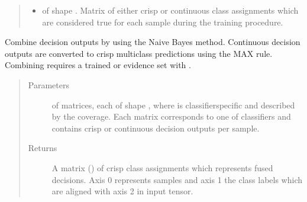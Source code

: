 \documentclass[letterpaper,10pt,english]{sphinxmanual}
\begin{document}
\begin{fulllineitems}
\begin{fulllineitems}
\begin{quote}
\begin{description}
\begin{itemize}
\item {} 
\sphinxAtStartPar
{} \textendash{}  of shape .
Matrix of either crisp or continuous class assignments which are considered true for each sample during
the training procedure.

\end{itemize}

\end{description}\end{quote}

\end{fulllineitems}


\begin{fulllineitems}
\label{\detokenize{pusion.core.naive_bayes_combiner:pusion.core.naive_bayes_combiner.CRNaiveBayesCombiner.combine}}
\sphinxAtStartPar
Combine decision outputs by using the Naive Bayes method.
Continuous decision outputs are converted to crisp multiclass predictions using the MAX rule.
Combining requires a trained {\hyperref[\detokenize{pusion.core.naive_bayes_combiner:pusion.core.naive_bayes_combiner.NaiveBayesCombiner}]{}} or evidence set with .
\begin{quote}\begin{description}
\item[{Parameters}] \leavevmode
\sphinxAtStartPar
{} \textendash{}  of  matrices, each of shape ,
where  is classifier\sphinxhyphen{}specific and described by the coverage. Each matrix corresponds to
one of  classifiers and contains crisp or continuous decision outputs per sample.

\item[{Returns}] \leavevmode
\sphinxAtStartPar
A matrix () of crisp class assignments which represents fused decisions.
Axis 0 represents samples and axis 1 the class labels which are aligned with axis 2 in
 input tensor.

\end{description}\end{quote}

\end{fulllineitems}


\end{fulllineitems}
\end{document}
